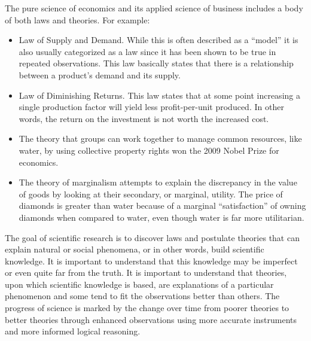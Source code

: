 The pure science of economics and its applied science of business includes a body of both laws and theories. For example:

\begin{itemize}
	\item Law of Supply and Demand. While this is often described as a ``model'' it is also usually categorized as a law since it has been shown to be true in repeated observations. This law basically states that there is a relationship between a product's demand and its supply.

	\item Law of Diminishing Returns. This law states that at some point increasing a single production factor will yield less profit-per-unit produced. In other words, the return on the investment is not worth the increased cost.

	\item The theory that groups can work together to manage common resources, like water, by using collective property rights won the 2009 Nobel Prize for economics.

	\item The theory of marginalism attempts to explain the discrepancy in the value of goods by looking at their secondary, or marginal, utility. The price of diamonds is greater than water because of a marginal ``satisfaction'' of owning diamonds when compared to water, even though water is far more utilitarian.  
\end{itemize}

The goal of scientific research is to discover laws and postulate theories that can explain natural or social phenomena, or in other words, build scientific knowledge. It is important to understand that this knowledge may be imperfect or even quite far from the truth. It is important to understand that theories, upon which scientific knowledge is based, are explanations of a particular phenomenon and some tend to fit the observations better than others. The progress of science is marked by the change over time from poorer theories to better theories through enhanced observations using more accurate instruments and more informed logical reasoning.

